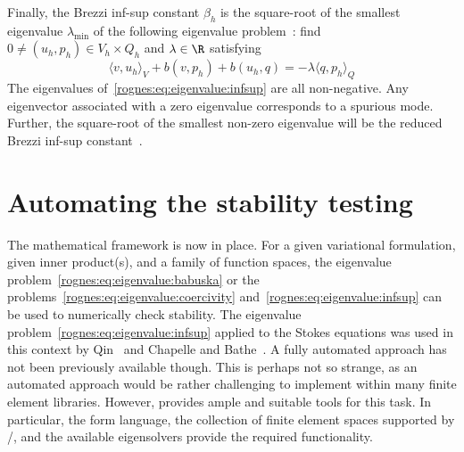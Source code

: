 Finally, the Brezzi inf-sup constant $\beta_h$ is the square-root of
the smallest eigenvalue $\lambda_{\min}$ of the following eigenvalue
problem~\cite{Malkus1981, Qin1994}: find $0 \not = (u_h, p_h) \in V_h
\times Q_h$ and $\lambda \in \R$ satisfying
\begin{equation}
  \label{rognes:eq:eigenvalue:infsup}
  \langle v, u_h \rangle_{V} + b(v, p_h) + b(u_h, q) = - \lambda
  \langle q, p_h \rangle_{Q}
\end{equation}
The eigenvalues of~\eqref{rognes:eq:eigenvalue:infsup} are all non-negative.
Any eigenvector associated with a zero eigenvalue corresponds to a
spurious mode. Further, the square-root of the smallest non-zero
eigenvalue will be the reduced Brezzi inf-sup
constant~\cite{Qin1994}.

\section{Automating the stability testing}
\label{rognes:sec:automation}

The mathematical framework is now in place. For a given variational
formulation, given inner product(s), and a family of function spaces,
the eigenvalue problem~\eqref{rognes:eq:eigenvalue:babuska} or the
problems~\eqref{rognes:eq:eigenvalue:coercivity}
and~\eqref{rognes:eq:eigenvalue:infsup} can be used to numerically
check stability. The eigenvalue
problem~\eqref{rognes:eq:eigenvalue:infsup} applied to the Stokes
equations was used in this context by Qin~\cite{Qin1994} and Chapelle
and Bathe~\cite{ChapelleBathe1993}. A fully automated approach has not
been previously available though. This is perhaps not so strange, as
an automated approach would be rather challenging to implement within
many finite element libraries. However, \pydolfin{} provides ample and
suitable tools for this task. In particular, the \ufl{} form language,
the collection of finite element spaces supported by \fiat{}/\ffc{},
and the available \slepc{} eigensolvers provide the required
functionality.

